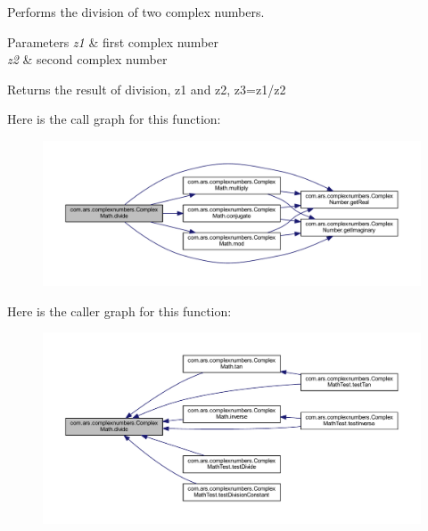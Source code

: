 Performs the division of two complex numbers. 
\begin{DoxyParams}{Parameters}
{\em z1} & first complex number \\
\hline
{\em z2} & second complex number \\
\hline
\end{DoxyParams}
\begin{DoxyReturn}{Returns}
the result of division, z1 and z2, z3=z1/z2 
\end{DoxyReturn}
Here is the call graph for this function\+:
\nopagebreak
\begin{figure}[H]
\begin{center}
\leavevmode
\includegraphics[width=350pt]{classcom_1_1ars_1_1complexnumbers_1_1_complex_math_a390a771ed2ef544949621be5375c806a_cgraph}
\end{center}
\end{figure}
Here is the caller graph for this function\+:
\nopagebreak
\begin{figure}[H]
\begin{center}
\leavevmode
\includegraphics[width=350pt]{classcom_1_1ars_1_1complexnumbers_1_1_complex_math_a390a771ed2ef544949621be5375c806a_icgraph}
\end{center}
\end{figure}
\hypertarget{classcom_1_1ars_1_1complexnumbers_1_1_complex_math_aeca04302a95a0a22e5bd7069455aacf6}{}\label{classcom_1_1ars_1_1complexnumbers_1_1_complex_math_aeca04302a95a0a22e5bd7069455aacf6} 
